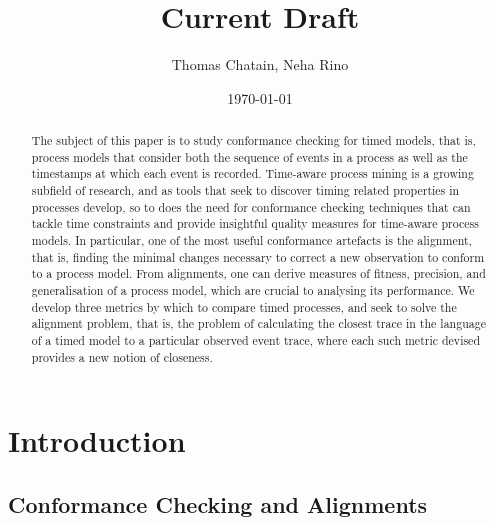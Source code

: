 \documentclass{article}
\title{Current Draft\\}
\author{Thomas Chatain, Neha Rino}
\date\today
\theoremstyle{Definition}
\theoremstyle{definition}
\begin{document}
	
	\maketitle 
	
	\begin{abstract}
		The subject of this paper is to study conformance checking for timed models, that is, process models that consider both the sequence of events in a process as well as the timestamps at which each event is recorded. 
		Time-aware process mining is a growing subfield of research, and as tools that seek to discover timing related properties in processes develop, so to does the need for conformance checking techniques that can tackle time constraints and provide insightful quality measures for time-aware process models. 
		In particular, one of the most useful conformance artefacts is the alignment, that is, finding the minimal changes necessary to correct a new observation to conform to a process model.  
		From alignments, one can derive measures of fitness, precision, and generalisation of a process model, which are crucial to analysing its performance. 
		We develop three metrics by which to compare timed processes, and seek to solve the alignment problem, that is, the problem of calculating the closest trace in the language of a timed model to a particular observed event trace, where each such metric devised provides a new notion of closeness. 
	\end{abstract}
	
	\section{Introduction} 
	
	\subsection{Conformance Checking and Alignments} 
		
\end{document}
